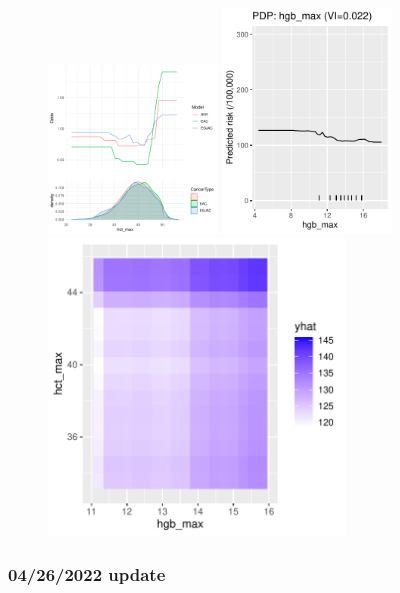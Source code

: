 \documentclass[12pt]{article}
\begin{document}
\begin{figure}[h]
\centering
\includegraphics[width=0.4\textwidth]{figures/pdp/hct_max.pdf}
\includegraphics[width=0.4\textwidth]{figures/pdp/hgb_max.pdf} \\
\includegraphics[width=0.7\textwidth]{figures/pdp_hct_hgb.pdf}
\end{figure}


\clearpage
\pagebreak
\subsubsection*{04/26/2022 update}
\end{document}

